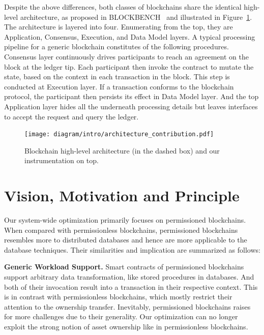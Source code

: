 Despite the above differences, both classes of blockchains share the identical high-level architecture, as proposed in BLOCKBENCH~\cite{dinh2017blockbench} and illustrated in Figure~\ref{diagram:intro:arch}. 
The architecture is layered into four. Enumerating from the top, they are Application, Consensus, Execution, and Data Model layers. 
A typical processing pipeline for a generic blockchain constitutes of the following procedures. 
Consensus layer continuously drives participants to reach an agreement on the block at the ledger tip. 
Each participant then invoke the contract to mutate the state, based on the context in each transaction in the block. 
This step is conducted at Execution layer.
If a transaction conforms to the blockchain protocol, the participant then persists its effect in Data Model layer. 
And the top Application layer hides all the underneath processing details but leaves interfaces to accept the request and query the ledger. 

\begin{figure}[!t]
  \centering
  \texttt{[image: diagram/intro/architecture\_contribution.pdf]}
  \vspace{\BeforeCaptionVSpace}
  \caption{Blockchain high-level architecture (in the dashed box) and our instrumentation on top. }
  \label{diagram:intro:arch}
\end{figure}

\section{Vision, Motivation and Principle}

Our system-wide optimization primarily focuses on permissioned blockchains.
When compared with permissionless blockchains, permissioned blockchains resembles more to distributed databases and hence are more applicable to the database techniques.  
Their similarities and implication are summarized as follows: 

\textbf{Generic Workload Support. } 
Smart contracts of permissioned blockchains support arbitrary data transformation, like stored procedures in databases. And both of their invocation result into a transaction in their respective context. 
This is in contrast with permissionless blockchains, which mostly restrict their attention to the ownership transfer. 
Inevitably, permissioned blockchains raises for more challenges due to their generality.
Our optimization can no longer exploit the strong notion of asset ownership like in permissionless blockchains. 

